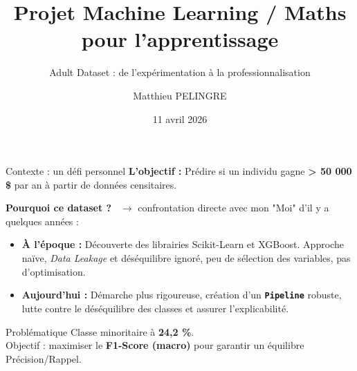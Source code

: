\documentclass[aspectratio=169, 10pt]{beamer}
\title[Prédiction de revenus - Adult Dataset]{Projet Machine Learning / Maths pour l'apprentissage}
\subtitle{Adult Dataset : de l'expérimentation à la professionnalisation}
\author{Matthieu PELINGRE}
\institute[M2 SDD]{Master 2 SDD}
\date{11 avril 2026}
\newcommand{\mytexttt}[1]{\texttt{\textbf{\textcolor{colortt}{#1}}}}
\begin{document}
\begin{frame}
    \titlepage
\end{frame}

\begin{frame}{Contexte : un défi personnel}
    \textbf{L'objectif :} Prédire si un individu gagne \textbf{> 50 000 \$} par an à partir de données censitaires.
    
    \pause
    \vspace{0.5cm}
    \textbf{Pourquoi ce dataset ?} \pause ~$\rightarrow$ confrontation directe avec mon "Moi" d'il y a quelques années : \pause
    \begin{itemize}
        \item \textbf{À l'époque :} Découverte des librairies Scikit-Learn et XGBoost. Approche naïve, \textit{Data Leakage} et déséquilibre ignoré, peu de sélection des variables, pas d'optimisation.
        \pause
        \item \textbf{Aujourd'hui :} Démarche plus rigoureuse, création d'un \mytexttt{Pipeline} robuste, lutte contre le déséquilibre des classes et assurer l'explicabilité.
    \end{itemize}

\pause
    \vspace{0.5cm}
    \begin{alertblock}{Problématique}
        Classe minoritaire à \textbf{24,2 \%}. \\ Objectif : maximiser le \textbf{F1-Score (macro)} pour garantir un équilibre Précision/Rappel.
    \end{alertblock}
\end{frame}
\end{document}
